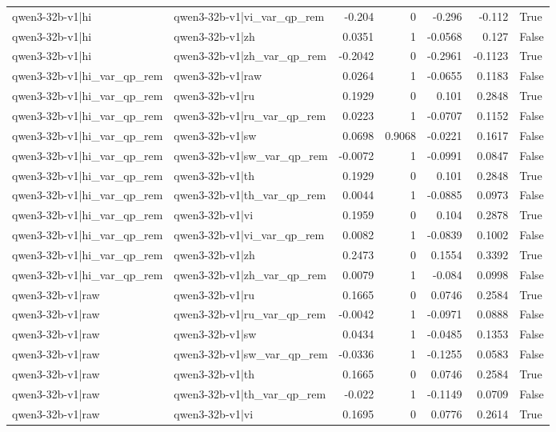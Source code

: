 \begin{table}
\begin{tabular}{l l r r r r l}
qwen3-32b-v1|hi & qwen3-32b-v1|vi_var_qp_rem & -0.204 & 0 & -0.296 & -0.112 & True \\
qwen3-32b-v1|hi & qwen3-32b-v1|zh & 0.0351 & 1 & -0.0568 & 0.127 & False \\
qwen3-32b-v1|hi & qwen3-32b-v1|zh_var_qp_rem & -0.2042 & 0 & -0.2961 & -0.1123 & True \\
qwen3-32b-v1|hi_var_qp_rem & qwen3-32b-v1|raw & 0.0264 & 1 & -0.0655 & 0.1183 & False \\
qwen3-32b-v1|hi_var_qp_rem & qwen3-32b-v1|ru & 0.1929 & 0 & 0.101 & 0.2848 & True \\
qwen3-32b-v1|hi_var_qp_rem & qwen3-32b-v1|ru_var_qp_rem & 0.0223 & 1 & -0.0707 & 0.1152 & False \\
qwen3-32b-v1|hi_var_qp_rem & qwen3-32b-v1|sw & 0.0698 & 0.9068 & -0.0221 & 0.1617 & False \\
qwen3-32b-v1|hi_var_qp_rem & qwen3-32b-v1|sw_var_qp_rem & -0.0072 & 1 & -0.0991 & 0.0847 & False \\
qwen3-32b-v1|hi_var_qp_rem & qwen3-32b-v1|th & 0.1929 & 0 & 0.101 & 0.2848 & True \\
qwen3-32b-v1|hi_var_qp_rem & qwen3-32b-v1|th_var_qp_rem & 0.0044 & 1 & -0.0885 & 0.0973 & False \\
qwen3-32b-v1|hi_var_qp_rem & qwen3-32b-v1|vi & 0.1959 & 0 & 0.104 & 0.2878 & True \\
qwen3-32b-v1|hi_var_qp_rem & qwen3-32b-v1|vi_var_qp_rem & 0.0082 & 1 & -0.0839 & 0.1002 & False \\
qwen3-32b-v1|hi_var_qp_rem & qwen3-32b-v1|zh & 0.2473 & 0 & 0.1554 & 0.3392 & True \\
qwen3-32b-v1|hi_var_qp_rem & qwen3-32b-v1|zh_var_qp_rem & 0.0079 & 1 & -0.084 & 0.0998 & False \\
qwen3-32b-v1|raw & qwen3-32b-v1|ru & 0.1665 & 0 & 0.0746 & 0.2584 & True \\
qwen3-32b-v1|raw & qwen3-32b-v1|ru_var_qp_rem & -0.0042 & 1 & -0.0971 & 0.0888 & False \\
qwen3-32b-v1|raw & qwen3-32b-v1|sw & 0.0434 & 1 & -0.0485 & 0.1353 & False \\
qwen3-32b-v1|raw & qwen3-32b-v1|sw_var_qp_rem & -0.0336 & 1 & -0.1255 & 0.0583 & False \\
qwen3-32b-v1|raw & qwen3-32b-v1|th & 0.1665 & 0 & 0.0746 & 0.2584 & True \\
qwen3-32b-v1|raw & qwen3-32b-v1|th_var_qp_rem & -0.022 & 1 & -0.1149 & 0.0709 & False \\
qwen3-32b-v1|raw & qwen3-32b-v1|vi & 0.1695 & 0 & 0.0776 & 0.2614 & True \\

\end{tabular}
\end{table}
